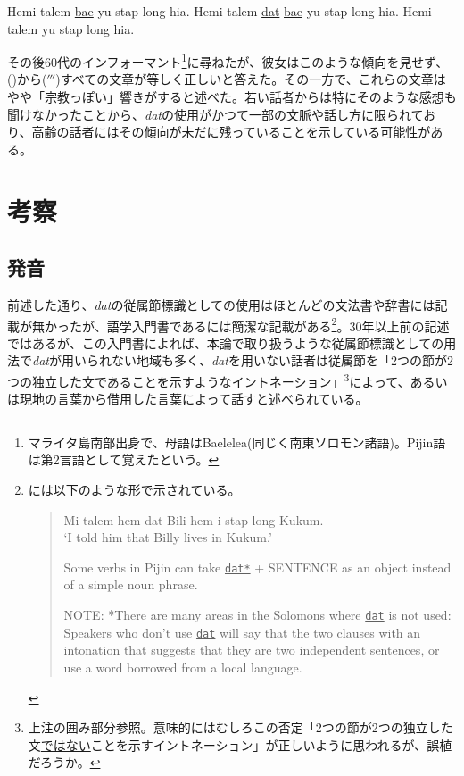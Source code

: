 \begin{exe}
 Hemi talem \underline{bae} yu stap long hia.
 Hemi talem \underline{dat} \underline{bae} yu stap long hia.
 Hemi talem yu stap long hia.
\end{exe}

その後60代のインフォーマント\footnote{
\label{fn:baelelea}マライタ島南部出身で、母語はBaelelea(同じく南東ソロモン諸語)。Pijin語は第2言語として覚えたという。}に尋ねたが、彼女はこのような傾向を見せず、()から($'''$)すべての文章が等しく正しいと答えた。その一方で、これらの文章はやや「宗教っぽい」響きがすると述べた。若い話者からは特にそのような感想も聞けなかったことから、\textit{dat}の使用がかつて一部の文脈や話し方に限られており、高齢の話者にはその傾向が未だに残っていることを示している可能性がある。

\section{考察}
\subsection{発音}
前述した通り、\textit{dat}の従属節標識としての使用はほとんどの文法書や辞書には記載が無かったが、語学入門書である\cite{eric}には簡潔な記載がある\footnote{
\cite{eric}には以下のような形で示されている。\vspace{0.1in}
\hspace{0.4in}\begin{quote}
\begin{exe}
   Mi talem hem dat Bili hem i stap long Kukum. \\
  `I told him that Billy lives in Kukum.'
\end{exe}\vspace{0.1in}
Some verbs in Pijin can take \underline{\texttt{dat*}} + SENTENCE as an object instead of a simple noun phrase.
\begin{screen}
NOTE: *There are many areas in the Solomons where \underline{\texttt{dat}} is not used: Speakers who don't use \underline{\texttt{dat}} will say that the two clauses with an intonation that suggests that they are two independent sentences, or use a word borrowed from a local language.
\end{screen}
\end{quote}
}。30年以上前の記述ではあるが、この入門書によれば、本論で取り扱うような従属節標識としての用法で\textit{dat}が用いられない地域も多く、\textit{dat}を用いない話者は従属節を「2つの節が2つの独立した文であることを示すようなイントネーション」\footnote{
上注の囲み部分参照。意味的にはむしろこの否定「2つの節が2つの独立した文\underline{ではない}ことを示すイントネーション」が正しいように思われるが、誤植だろうか。}によって、あるいは現地の言葉から借用した言葉によって話すと述べられている。

